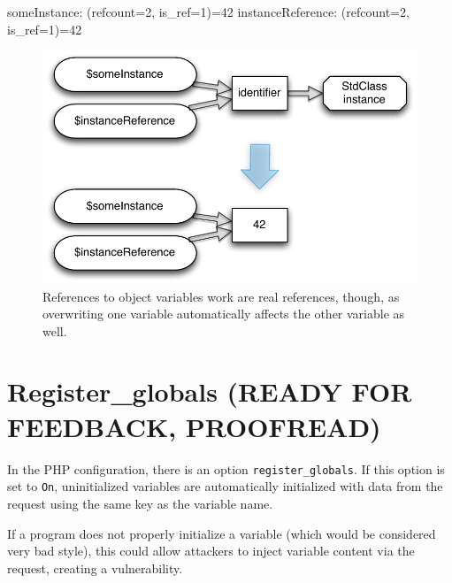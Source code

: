 
\begin{textcode}
someInstance: (refcount=2, is_ref=1)=42
instanceReference: (refcount=2, is_ref=1)=42
\end{textcode}

\begin{figure}[htb]
  \begin{center}
    \includegraphics[scale=0.8]{images/someInstance_instanceReference}
    \caption{References to object variables work are real references, though, as overwriting one variable automatically affects the other variable as well.}
    \label{fig:real-object-references}
  \end{center}
\end{figure}


\section{Register\_globals (READY FOR FEEDBACK, PROOFREAD)}
\label{register-globals}

In the PHP configuration, there is an option \texttt{register\_globals}. If this option is set to \texttt{On}, uninitialized variables are automatically initialized with data from the request using the same key as the variable name.

If a program does not properly initialize a variable (which would be considered very bad style), this could allow attackers to inject variable content via the request, creating a vulnerability.

